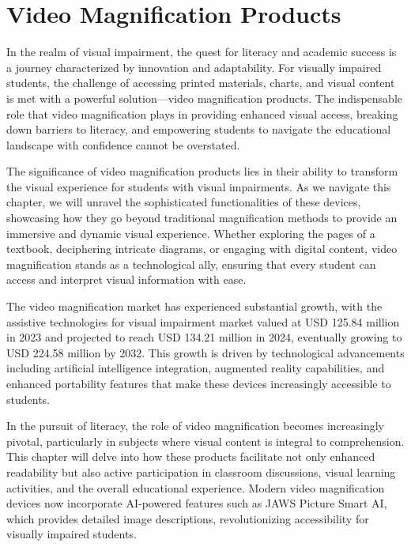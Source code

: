 \chapter{Video Magnification Products}\label{ch6:chap:video-magnification}
\raggedright
In the realm of visual impairment, the quest for literacy and academic success is a journey characterized by innovation and adaptability. For visually impaired students, the challenge of accessing printed materials, charts, and visual content is met with a powerful solution—video magnification products. The indispensable role that video magnification plays in providing enhanced visual access, breaking down barriers to literacy, and empowering students to navigate the educational landscape with confidence cannot be overstated.\supercite{PerkinsVideoMagnifier, AFBMagnification}

The significance of video \gls{magnification} products lies in their ability to transform the visual experience for students with visual impairments. As we navigate this chapter, we will unravel the sophisticated functionalities of these devices, showcasing how they go beyond traditional \gls{magnification} methods to provide an immersive and dynamic visual experience. Whether exploring the pages of a textbook, deciphering intricate diagrams, or engaging with digital content, video \gls{magnification} stands as a technological ally, ensuring that every student can access and interpret visual information with ease.

The video magnification market has experienced substantial growth, with the assistive technologies for visual impairment market valued at USD 125.84 million in 2023 and projected to reach USD 134.21 million in 2024, eventually growing to USD 224.58 million by 2032. This growth is driven by technological advancements including artificial intelligence integration, augmented reality capabilities, and enhanced portability features that make these devices increasingly accessible to students.\supercite{BrailleMarketResearch}

In the pursuit of literacy, the role of video magnification becomes increasingly pivotal, particularly in subjects where visual content is integral to comprehension. This chapter will delve into how these products facilitate not only enhanced readability but also active participation in classroom discussions, visual learning activities, and the overall educational experience. Modern video magnification devices now incorporate AI-powered features such as JAWS Picture Smart AI, which provides detailed image descriptions, revolutionizing accessibility for visually impaired students.\supercite{JAWSAILabeler, msseeingai}

